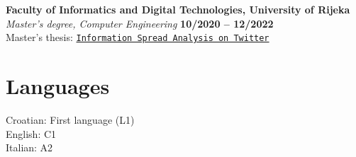 \documentclass[margin,line]{resume}
\begin{document}
\begin{resume}
    \textbf{Faculty of Informatics and Digital Technologies, University of Rijeka} \vspace{2mm}\\\vspace{1mm}%
    \textsl{Master's degree, Computer Engineering} \hfill \textbf{10/2020 -- 12/2022}\\
    Master's thesis: \href{{https://zir.nsk.hr/islandora/object/infri%3A999}}{{\texttt{{Information Spread Analysis on Twitter}}}}


    \vspace{3mm}
    
        \section{\mysidestyle Languages}

    Croatian: First language (L1) \\
	English: C1 \\
	Italian: A2 \\

\end{resume}
\end{document}
